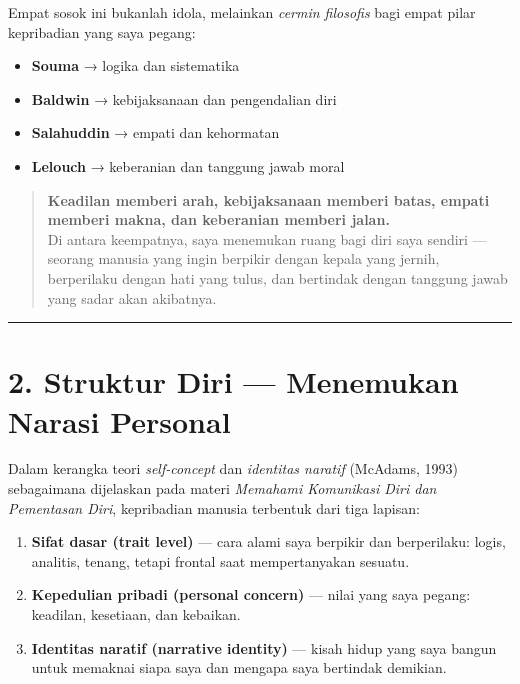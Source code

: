\documentclass[
  letterpaper,
  DIV=11,
  numbers=noendperiod]{scrreprt}
\providecommand{\tightlist}{%
  \setlength{\itemsep}{0pt}\setlength{\parskip}{0pt}}
\begin{document}
Empat sosok ini bukanlah idola, melainkan \emph{cermin filosofis} bagi
empat pilar kepribadian yang saya pegang:

\begin{itemize}
\tightlist
\item
  \textbf{Souma} → logika dan sistematika\\
\item
  \textbf{Baldwin} → kebijaksanaan dan pengendalian diri\\
\item
  \textbf{Salahuddin} → empati dan kehormatan\\
\item
  \textbf{Lelouch} → keberanian dan tanggung jawab moral
\end{itemize}

\begin{quote}
\textbf{Keadilan memberi arah, kebijaksanaan memberi batas, empati
memberi makna, dan keberanian memberi jalan.}\\
Di antara keempatnya, saya menemukan ruang bagi diri saya sendiri ---
seorang manusia yang ingin berpikir dengan kepala yang jernih,
berperilaku dengan hati yang tulus, dan bertindak dengan tanggung jawab
yang sadar akan akibatnya.
\end{quote}

\begin{center}\rule{0.5\linewidth}{0.5pt}\end{center}

\section{\texorpdfstring{\textbf{2. Struktur Diri --- Menemukan Narasi
Personal}}{2. Struktur Diri --- Menemukan Narasi Personal}}\label{struktur-diri-menemukan-narasi-personal}

Dalam kerangka teori \emph{self-concept} dan \emph{identitas naratif}
(McAdams, 1993) sebagaimana dijelaskan pada materi \emph{Memahami
Komunikasi Diri dan Pementasan Diri}, kepribadian manusia terbentuk dari
tiga lapisan:

\begin{enumerate}
\def\labelenumi{\arabic{enumi}.}
\tightlist
\item
  \textbf{Sifat dasar (trait level)} --- cara alami saya berpikir dan
  berperilaku: logis, analitis, tenang, tetapi frontal saat
  mempertanyakan sesuatu.\\
\item
  \textbf{Kepedulian pribadi (personal concern)} --- nilai yang saya
  pegang: keadilan, kesetiaan, dan kebaikan.\\
\item
  \textbf{Identitas naratif (narrative identity)} --- kisah hidup yang
  saya bangun untuk memaknai siapa saya dan mengapa saya bertindak
  demikian.
\end{enumerate}
\end{document}
